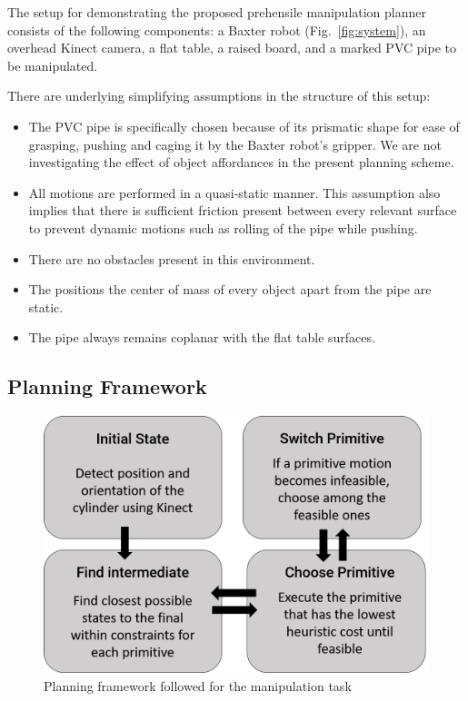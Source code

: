 \documentclass[runningheads,letterpaper]{llncs}
\begin{document}
The setup for demonstrating the proposed prehensile manipulation planner consists of the following components: a Baxter robot (Fig.~\ref{fig:system}), an overhead Kinect camera, a flat table, a raised board, and a marked PVC pipe to be manipulated.

There are underlying simplifying assumptions in the structure of this setup:
\begin{itemize}
\item
The PVC pipe is specifically chosen because of its prismatic shape for ease of grasping, pushing and caging it by the Baxter robot's gripper. We are not investigating the effect of object affordances in the present planning scheme. 
\item
All motions are performed in a quasi-static manner. This assumption also implies that there is sufficient friction present between every relevant surface to prevent dynamic motions such as rolling of the pipe while pushing. 
\item
There are no obstacles present in this environment.
\item
The positions the center of mass of every object apart from the pipe are static.
\item
The pipe always remains coplanar with the flat table surfaces. 
\end{itemize}

\subsection{Planning Framework}
\label{sec:planning}
\begin{figure}
\centering
	\includegraphics[width=0.8\columnwidth]{images/flow.png}
\caption{Planning framework followed for the manipulation task}
\label{fig:plan}
\end{figure}
\end{document}
